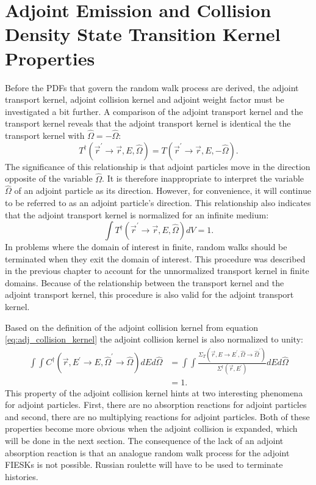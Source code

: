 \section{Adjoint Emission and Collision Density State Transition Kernel Properties}
Before the PDFs that govern the random walk process are derived, the adjoint
transport kernel, adjoint collision kernel and adjoint weight factor must be 
investigated a bit further. A comparison of the adjoint transport kernel and 
the transport kernel reveals that the adjoint transport kernel is identical 
the the transport kernel with $\hat{\Omega} = -\hat{\Omega}$:
\begin{equation}
  T^{\dagger}(\vec{r}^{'} \to \vec{r},E,\hat{\Omega}) = 
  T(\vec{r}^{'} \to \vec{r},E,-\hat{\Omega}).
\end{equation}
The significance of this relationship is that adjoint particles move in the 
direction opposite of the variable $\hat{\Omega}$. It is therefore 
inappropriate to interpret the variable $\hat{\Omega}$ of an adjoint particle 
as its direction. However, for convenience, it will continue to be referred to 
as an adjoint particle's direction. This relationship also indicates that the 
adjoint transport kernel is normalized for an infinite medium:
\begin{equation}
  \int T^{\dagger}(\vec{r}^{'} \to \vec{r},E,\hat{\Omega}) dV = 1.
\end{equation}
In problems where the domain of interest in finite, random walks should be 
terminated when they exit the domain of interest. This procedure was described
in the previous chapter to account for the unnormalized transport kernel in
finite domains. Because of the relationship between the transport kernel and 
the adjoint transport kernel, this procedure is also valid for the adjoint
transport kernel. 

Based on the definition of the adjoint collision kernel from equation
\ref{eq:adj_collision_kernel} the adjoint collision kernel is also normalized 
to unity:
\begin{align}
  \int\int C^{\dagger}(\vec{r},E^{'} \to E,\hat{\Omega}^{'} \to \hat{\Omega})
  dE d\hat{\Omega} & = \int\int 
  \frac{\Sigma_T(\vec{r},E \to E^{'},\hat{\Omega} \to \hat{\Omega}^{'})} 
       {\Sigma^{\dagger}(\vec{r},E^{'})} dEd\hat{\Omega} \nonumber \\
  & = 1. \nonumber 
\end{align}
This property of the adjoint collision kernel hints at two interesting
phenomena for adjoint particles. First, there are no absorption reactions for
adjoint particles and second, there are no multiplying reactions for adjoint
particles. Both of these properties become more obvious when the adjoint
collision is expanded, which will be done in the next section. The consequence 
of the lack of an adjoint absorption reaction is that an analogue random walk 
process for the adjoint FIESKs is not possible. Russian roulette will have to 
be used to terminate histories.

